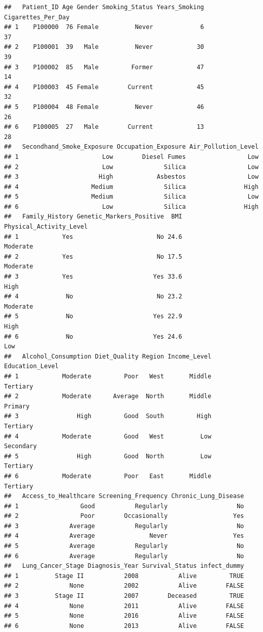 \documentclass[
]{article}
\begin{document}
\begin{verbatim}
##   Patient_ID Age Gender Smoking_Status Years_Smoking Cigarettes_Per_Day
## 1    P100000  76 Female          Never             6                 37
## 2    P100001  39   Male          Never            30                 39
## 3    P100002  85   Male         Former            47                 14
## 4    P100003  45 Female        Current            45                 32
## 5    P100004  48 Female          Never            46                 26
## 6    P100005  27   Male        Current            13                 28
##   Secondhand_Smoke_Exposure Occupation_Exposure Air_Pollution_Level
## 1                       Low        Diesel Fumes                 Low
## 2                       Low              Silica                 Low
## 3                      High            Asbestos                 Low
## 4                    Medium              Silica                High
## 5                    Medium              Silica                 Low
## 6                       Low              Silica                High
##   Family_History Genetic_Markers_Positive  BMI Physical_Activity_Level
## 1            Yes                       No 24.6                Moderate
## 2            Yes                       No 17.5                Moderate
## 3            Yes                      Yes 33.6                    High
## 4             No                       No 23.2                Moderate
## 5             No                      Yes 22.9                    High
## 6             No                      Yes 24.6                     Low
##   Alcohol_Consumption Diet_Quality Region Income_Level Education_Level
## 1            Moderate         Poor   West       Middle        Tertiary
## 2            Moderate      Average  North       Middle         Primary
## 3                High         Good  South         High        Tertiary
## 4            Moderate         Good   West          Low       Secondary
## 5                High         Good  North          Low        Tertiary
## 6            Moderate         Poor   East       Middle        Tertiary
##   Access_to_Healthcare Screening_Frequency Chronic_Lung_Disease
## 1                 Good           Regularly                   No
## 2                 Poor        Occasionally                  Yes
## 3              Average           Regularly                   No
## 4              Average               Never                  Yes
## 5              Average           Regularly                   No
## 6              Average           Regularly                   No
##   Lung_Cancer_Stage Diagnosis_Year Survival_Status infect_dummy
## 1          Stage II           2008           Alive         TRUE
## 2              None           2002           Alive        FALSE
## 3          Stage II           2007        Deceased         TRUE
## 4              None           2011           Alive        FALSE
## 5              None           2016           Alive        FALSE
## 6              None           2013           Alive        FALSE
\end{verbatim}
\end{document}
